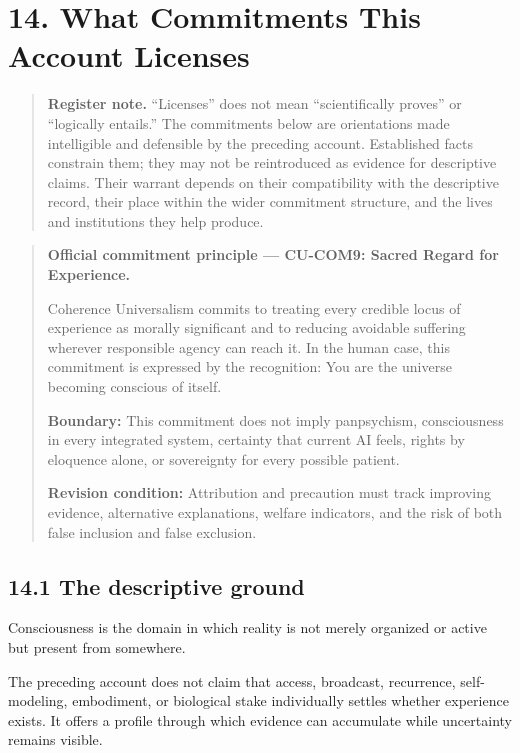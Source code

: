 \documentclass[
  11pt,
]{article}
\begin{document}
\section{14. What Commitments This Account
Licenses}\label{what-commitments-this-account-licenses}

\begin{quote}
\textbf{Register note.} ``Licenses'' does not mean ``scientifically
proves'' or ``logically entails.'' The commitments below are
orientations made intelligible and defensible by the preceding account.
Established facts constrain them; they may not be reintroduced as
evidence for descriptive claims. Their warrant depends on their
compatibility with the descriptive record, their place within the wider
commitment structure, and the lives and institutions they help produce.
\end{quote}

\begin{quote}
\textbf{Official commitment principle --- CU-COM9: Sacred Regard for
Experience.}

Coherence Universalism commits to treating every credible locus of
experience as morally significant and to reducing avoidable suffering
wherever responsible agency can reach it. In the human case, this
commitment is expressed by the recognition: You are the universe
becoming conscious of itself.

\textbf{Boundary:} This commitment does not imply panpsychism,
consciousness in every integrated system, certainty that current AI
feels, rights by eloquence alone, or sovereignty for every possible
patient.

\textbf{Revision condition:} Attribution and precaution must track
improving evidence, alternative explanations, welfare indicators, and
the risk of both false inclusion and false exclusion.
\end{quote}

\subsection{14.1 The descriptive ground}\label{the-descriptive-ground}

Consciousness is the domain in which reality is not merely organized or
active but present from somewhere.

The preceding account does not claim that access, broadcast, recurrence,
self-modeling, embodiment, or biological stake individually settles
whether experience exists. It offers a profile through which evidence
can accumulate while uncertainty remains visible.
\end{document}
